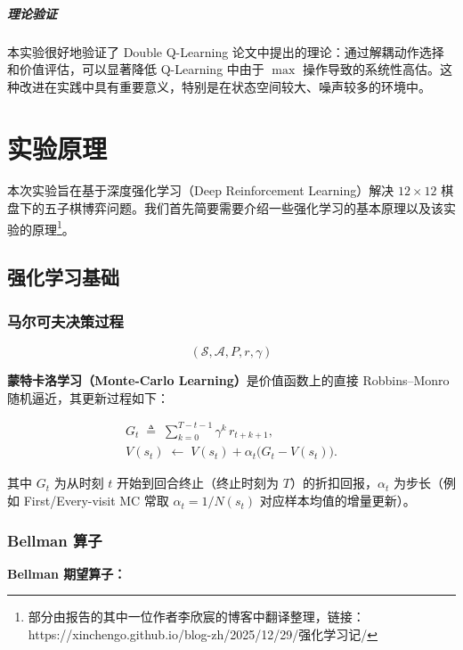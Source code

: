 \documentclass[oneside]{ctexbook}
\begin{document}
\paragraph{理论验证}
本实验很好地验证了 Double Q-Learning 论文中提出的理论：通过解耦动作选择和价值评估，可以显著降低 Q-Learning 中由于 $\max$ 操作导致的系统性高估。这种改进在实践中具有重要意义，特别是在状态空间较大、噪声较多的环境中。

\chapter{实验原理} \label{chap:theory}

本次实验旨在基于深度强化学习（Deep Reinforcement Learning）解决 $12 \times 12$ 棋盘下的五子棋博弈问题。我们首先简要需要介绍一些强化学习的基本原理以及该实验的原理\footnote{部分由报告的其中一位作者李欣宸的博客中翻译整理，链接：https://xinchengo.github.io/blog-zh/2025/12/29/强化学习记/}。

\section{强化学习基础} \label{sec:rl_basics}
\subsection{马尔可夫决策过程}

\begin{equation}
(\mathcal S, \mathcal A, P, r, \gamma)
\end{equation}

\textbf{蒙特卡洛学习（Monte-Carlo Learning）}是价值函数上的直接 Robbins--Monro 随机逼近，其更新过程如下：

\begin{gather}
G_t \;\triangleq\; \sum_{k=0}^{T-t-1} \gamma^k \, r_{t+k+1},\\
V(s_t) \;\leftarrow\; V(s_t) + \alpha_t\bigl(G_t - V(s_t)\bigr).
\end{gather}

其中 $G_t$ 为从时刻 $t$ 开始到回合终止（终止时刻为 $T$）的折扣回报，$\alpha_t$ 为步长（例如 First/Every-visit MC 常取 $\alpha_t=1/N(s_t)$ 对应样本均值的增量更新）。



\subsection{Bellman 算子}

\textbf{Bellman 期望算子：}
\end{document}
